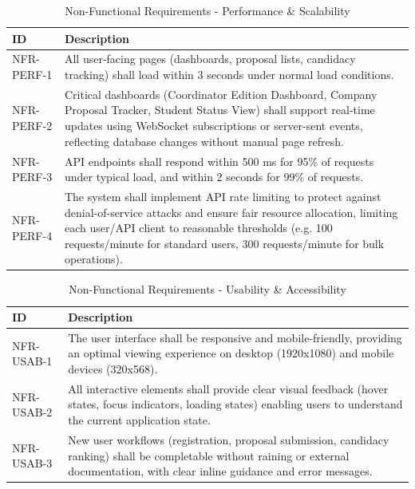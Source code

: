 {
    \begin{table}[H]
        \centering
        \caption{Non-Functional Requirements - Performance \& Scalability}
        \begin{tabular}{|l|p{11cm}|} %
            \hline
            \textbf{ID} & \textbf{Description} \\ \hline
            NFR-PERF-1 & All user-facing pages (dashboards, proposal lists, candidacy tracking) shall load within 3 seconds under normal load conditions. \\ \hline
            NFR-PERF-2 & Critical dashboards (Coordinator Edition Dashboard, Company Proposal Tracker, Student Status View) shall support real-time updates using WebSocket subscriptions or server-sent events, reflecting database changes without manual page refresh. \\ \hline
            NFR-PERF-3 & API endpoints shall respond within 500 ms for 95\% of requests under typical load, and within 2 seconds for 99\% of requests. \\ \hline
            NFR-PERF-4 & The system shall implement API rate limiting to protect against denial-of-service attacks and ensure fair resource allocation, limiting each user/API client to reasonable thresholds (e.g. 100 requests/minute for standard users, 300 requests/minute for bulk operations). \\ \hline
        \end{tabular}
    \end{table}    
}

{
    \begin{table}[H]
        \centering
        \caption{Non-Functional Requirements - Usability \& Accessibility}
        \begin{tabular}{|l|p{11cm}|} %
            \hline
            \textbf{ID} & \textbf{Description} \\ \hline
            NFR-USAB-1 & The user interface shall be responsive and mobile-friendly, providing an optimal viewing experience on desktop (1920x1080) and mobile devices (320x568). \\ \hline
            NFR-USAB-2 & All interactive elements shall provide clear visual feedback (hover states, focus indicators, loading states) enabling users to understand the current application state. \\ \hline
            NFR-USAB-3 & New user workflows (registration, proposal submission, candidacy ranking) shall be completable without raining or external documentation, with clear inline guidance and error messages. \\ \hline
        \end{tabular}
    \end{table}    
}

